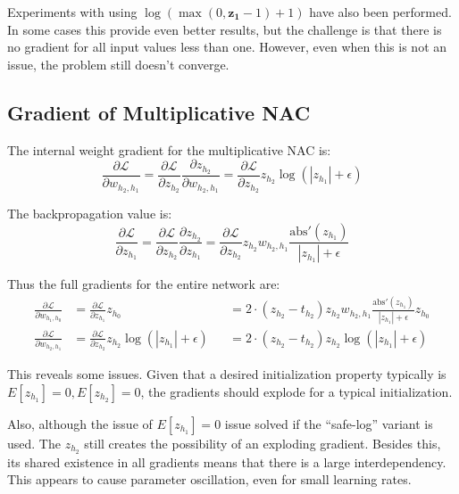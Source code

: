 \documentclass[a4paper]{article}
\begin{document}
Experiments with using $\log(\max(0, \mathbf{z_1} - 1) + 1)$ have also been performed. In some cases this provide even better results, but the challenge is that there is no gradient for all input values less than one. However, even when this is not an issue, the problem still doesn't converge.

\subsection{Gradient of Multiplicative NAC}

The internal weight gradient for the multiplicative NAC is:
\begin{equation}
\frac{\partial \mathcal{L}}{\partial w_{h_2, h_1}} = \frac{\partial \mathcal{L}}{\partial z_{h_2}} \frac{\partial z_{h_2}}{\partial w_{h_2, h_1}} = \frac{\partial \mathcal{L}}{\partial z_{h_2}} z_{h_2} \log(|z_{h_1}| + \epsilon)
\end{equation}

The backpropagation value is:
\begin{equation}
\frac{\partial \mathcal{L}}{\partial z_{h_1}} = \frac{\partial \mathcal{L}}{\partial z_{h_2}} \frac{\partial z_{h_2}}{\partial z_{h_1}} = \frac{\partial \mathcal{L}}{\partial z_{h_2}} z_{h_2} w_{h_2, h_1} \frac{\mathrm{abs}'(z_{h_1})}{|z_{h_1}| + \epsilon}
\end{equation}

Thus the full gradients for the entire network are:
\begin{equation}
\begin{aligned}
\frac{\partial \mathcal{L}}{\partial w_{h_1, h_0}} &= \frac{\partial \mathcal{L}}{\partial z_{h_1}} z_{h_0} &&= 2 \cdot (z_{h_2} - t_{h_2}) z_{h_2} w_{h_2, h_1} \frac{\mathrm{abs}'(z_{h_1})}{|z_{h_1}| + \epsilon} z_{h_0} \\
\frac{\partial \mathcal{L}}{\partial w_{h_2, h_1}} &= \frac{\partial \mathcal{L}}{\partial z_{h_2}} z_{h_2} \log(|z_{h_1}| + \epsilon) &&= 2 \cdot (z_{h_2} - t_{h_2}) z_{h_2} \log(|z_{h_1}| + \epsilon)
\end{aligned}
\end{equation}

This reveals some issues. Given that a desired initialization property typically is $E[z_{h_1}] = 0, E[z_{h_2}] = 0$, the gradients should explode for a typical initialization.

Also, although the issue of $E[z_{h_1}] = 0$ issue solved if the ``safe-log'' variant is used. The $z_{h_2}$ still creates the possibility of an exploding gradient. Besides this, its shared existence in all gradients means that there is a large interdependency. This appears to cause parameter oscillation, even for small learning rates.
\end{document}
